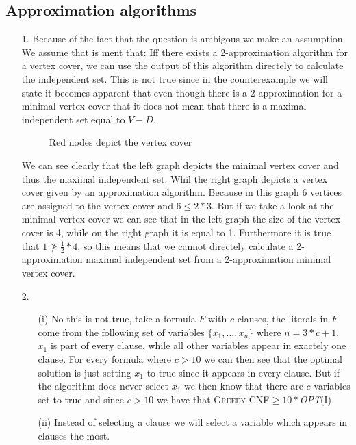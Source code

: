 \documentclass{article}
\begin{document}
\subsection*{Approximation algorithms}
\begin{itemize}
\item[1.] Because of the fact that the question is ambigous we make an assumption. We assume that is ment that: Iff there exists a 2-approximation algorithm for a vertex cover, we can use the output of this algorithm directely to calculate the independent set. This is not true since in the counterexample we will state it becomes apparent that even though there is a 2 approximation for a minimal vertex cover that it does not mean that there is a maximal independent set equal to $V-D$. 

\begin{figure}[h!]
  \centering
  \caption{Red nodes depict the vertex cover}
\end{figure}
We can see clearly that the left graph depicts the minimal vertex cover and thus the maximal independent set. Whil the right graph depicts a vertex cover given by an approximation algorithm. Because in this graph 6 vertices are assigned to the vertex cover and $6 \le 2 * 3$. But if we take a look at the minimal vertex cover we can see that in the left graph the size of the vertex cover is 4, while on the right graph it is equal to 1. Furthermore it is true that $1 \ngeq \frac{1}{2}*4$, so this means that we cannot directely calculate a 2-approximation maximal independent set from a 2-approximation minimal vertex cover.

\item[2.]
\begin{itemize}
\item[(i)] No this is not true, take a formula $F$ with $c$ clauses, the literals in $F$ come from the following set of variables $\{x_1,...,x_n\}$ where $n=3*c+1$. $x_1$ is part of every clause, while all other variables appear in exactely one clause. For every formula where $c>10$ we can then see that the optimal solution is just setting $x_1$ to true since it appears in every clause. But if the algorithm does never select $x_1$ we then know that there are $c$ variables set to true and since $c>10$ we have that \textsc{Greedy-CNF}$\ge10*$\emph{OPT}(I)

\newpage
\item[(ii)] Instead of selecting a clause we will select a variable which appears in clauses the most.



\end{itemize}
\end{itemize}
\end{document}
